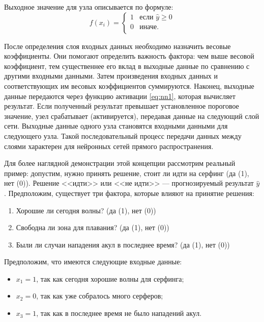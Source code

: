 Выходное значение для узла описывается по формуле:
\begin{equation}
	\label{eq:nn1}
	f(x_i) = \begin{cases}
		1 & \text{если $\hat{y} \ge 0$}\\
		0 & \text{иначе.}\\
		\end{cases}
\end{equation}

После определения слоя входных данных необходимо назначить весовые коэффициенты. Они помогают определить важность фактора: чем выше весовой коэффициент, тем существеннее его вклад в выходные данные по сравнению с другими входными данными. Затем произведения входных данных и соответствующих им весовых коэффициентов суммируются. Наконец, выходные данные передаются через функцию активации \ref{eq:nn1}, которая вычисляет результат. Если полученный результат превышает установленное пороговое значение, узел срабатывает (активируется), передавая данные на следующий слой сети. Выходные данные одного узла становятся входными данными для следующего узла. Такой последовательный процесс передачи данных между слоями характерен для нейронных сетей прямого распространения.

Для более наглядной демонстрации этой концепции рассмотрим реальный пример: допустим, нужно принять решение, стоит ли идти на серфинг (да (1), нет (0)). Решение <<идти>> или <<не идти>> --- прогнозируемый результат $\hat{y}$. Предположим, существует три фактора, которые влияют на принятие решения:

\begin{enumerate}[leftmargin=1.6\parindent]
	\item Хорошие ли сегодня волны? (да (1), нет (0))
	\item Свободна ли зона для плавания? (да (1), нет (0))
	\item Были ли случаи нападения акул в последнее время? (да (1), нет (0))
\end{enumerate}

Предположим, что имеются следующие входные данные:

\begin{itemize}[leftmargin=1.6\parindent]
	\item $x_1 = 1$, так как сегодня хорошие волны для серфинга;
	\item $x_2 = 0$, так как уже собралось много серферов;
	\item $x_3 = 1$, так как в последнее время не было нападений акул.
\end{itemize}

